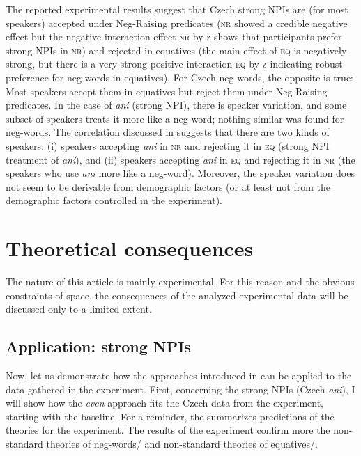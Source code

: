 \documentclass[output=paper,colorlinks,citecolor=brown]{langscibook}
\begin{document}
The reported experimental results suggest that Czech strong NPIs are (for most speakers) accepted under Neg-Raising predicates (\textsc{nr} showed a credible negative effect but the negative interaction effect \textsc{nr} by \textsc{z} shows that participants prefer strong NPIs in \textsc{nr}) and rejected in equatives (the main effect of \textsc{eq} is negatively strong, but there is a very strong positive interaction \textsc{eq} by \textsc{z} indicating robust preference for neg-words in equatives). For Czech neg-words, the opposite is true: Most speakers accept them in equatives but reject them under Neg-Raising predicates. In the case of \textit{ani} (strong NPI), there is speaker variation, and some subset of speakers treats it more like a neg-word; nothing similar was found for neg-words. The correlation discussed in  suggests that there are two kinds of speakers: (i) speakers accepting \textit{ani} in \textsc{nr} and rejecting it in \textsc{eq} (strong NPI treatment of \textit{ani}), and (ii) speakers accepting \textit{ani} in \textsc{eq} and rejecting it in \textsc{nr} (the speakers who use \textit{ani} more like a neg-word).  Moreover, the speaker variation does not seem to be derivable from demographic factors (or at least not from the demographic factors controlled in the experiment).


\section{Theoretical consequences}\label{sec:theoretical_consequences}

The nature of this article is mainly experimental. For this reason and the obvious constraints of space, the consequences of the analyzed experimental data will be discussed only to a limited extent. 

\subsection{Application: strong NPIs}\label{sec:application-strong-npis}

Now, let us demonstrate how the approaches introduced in  can be applied to the data gathered in the experiment. First, concerning the strong NPIs (Czech \textit{ani}), I will show how the \textit{even}-approach fits the Czech data from the experiment, starting with the baseline. For a reminder, the  summarizes predictions of the theories for the experiment. The results of the experiment confirm more the non-standard theories of neg-words/\citet{ovalle2004double} and non-standard theories of equatives/\citet{penka2016degree}.
\end{document}
